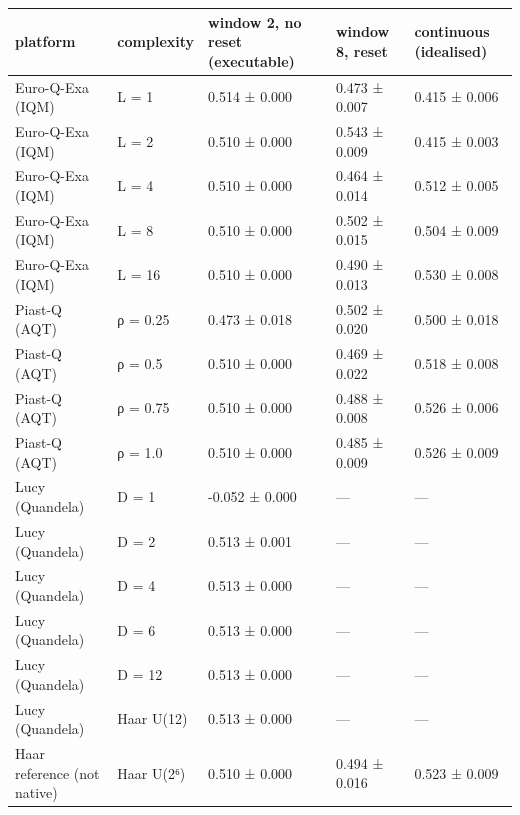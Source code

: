 \begin{tabular}{lllll}
\toprule
platform & complexity & window 2, no reset (executable) & window 8, reset & continuous (idealised) \\
\midrule
Euro-Q-Exa (IQM) & L = 1 & 0.514 ± 0.000 & 0.473 ± 0.007 & 0.415 ± 0.006 \\
Euro-Q-Exa (IQM) & L = 2 & 0.510 ± 0.000 & 0.543 ± 0.009 & 0.415 ± 0.003 \\
Euro-Q-Exa (IQM) & L = 4 & 0.510 ± 0.000 & 0.464 ± 0.014 & 0.512 ± 0.005 \\
Euro-Q-Exa (IQM) & L = 8 & 0.510 ± 0.000 & 0.502 ± 0.015 & 0.504 ± 0.009 \\
Euro-Q-Exa (IQM) & L = 16 & 0.510 ± 0.000 & 0.490 ± 0.013 & 0.530 ± 0.008 \\
Piast-Q (AQT) & ρ = 0.25 & 0.473 ± 0.018 & 0.502 ± 0.020 & 0.500 ± 0.018 \\
Piast-Q (AQT) & ρ = 0.5 & 0.510 ± 0.000 & 0.469 ± 0.022 & 0.518 ± 0.008 \\
Piast-Q (AQT) & ρ = 0.75 & 0.510 ± 0.000 & 0.488 ± 0.008 & 0.526 ± 0.006 \\
Piast-Q (AQT) & ρ = 1.0 & 0.510 ± 0.000 & 0.485 ± 0.009 & 0.526 ± 0.009 \\
Lucy (Quandela) & D = 1 & -0.052 ± 0.000 & — & — \\
Lucy (Quandela) & D = 2 & 0.513 ± 0.001 & — & — \\
Lucy (Quandela) & D = 4 & 0.513 ± 0.000 & — & — \\
Lucy (Quandela) & D = 6 & 0.513 ± 0.000 & — & — \\
Lucy (Quandela) & D = 12 & 0.513 ± 0.000 & — & — \\
Lucy (Quandela) & Haar U(12) & 0.513 ± 0.000 & — & — \\
Haar reference (not native) & Haar U(2⁶) & 0.510 ± 0.000 & 0.494 ± 0.016 & 0.523 ± 0.009 \\
\bottomrule
\end{tabular}
